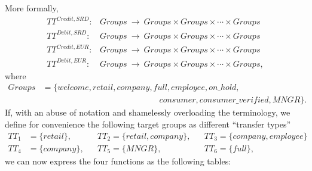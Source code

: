 More formally,
\begin{align}
TT^{Credit,SRD}\colon &Groups\ \rightarrow\ Groups \times Groups \times \cdots \times Groups \\
TT^{Debit,SRD}\colon &Groups\ \rightarrow\ Groups \times Groups \times \cdots \times Groups \\
TT^{Credit,EUR}\colon &Groups\ \rightarrow\ Groups \times Groups \times \cdots \times Groups \\
TT^{Debit,EUR}\colon &Groups\ \rightarrow\ Groups \times Groups \times \cdots \times Groups,
\end{align}
where
\begin{align}
Groups &= \{ welcome, retail, company, full, employee, on\text{\_}hold,  \nonumber \\
		& \qquad\qquad\qquad\qquad\qquad\qquad\qquad
			consumer, consumer\text{\_}verified, MNGR \}.
\end{align}
If, with an abuse of notation and shamelessly overloading the terminology, we define for convenience the following target groups as different ``transfer types''
\begin{align*}
TT_1 &= \{ retail \},		&& TT_2 = \{ retail, company \},		&& TT_3 = \{ company, employee \} \\
TT_4 &= \{ company \},	&& TT_5 = \{ MNGR \},			&& TT_6 = \{ full \},
\end{align*}
we can now express the four functions as the following tables:

